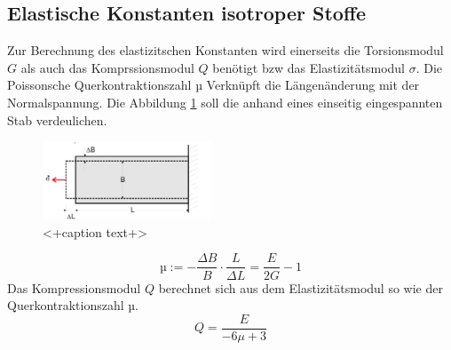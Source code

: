 \subsection{Elastische Konstanten isotroper Stoffe}
Zur Berechnung des elastizitschen Konstanten wird einerseits die Torsionsmodul $G$ als auch das Komprssionsmodul $Q$ benötigt bzw das Elastizitätsmodul $\sigma$.
Die Poissonsche Querkontraktionszahl µ Verknüpft die Längenänderung mit der Normalspannung. Die Abbildung \ref{fig:poisson} soll die anhand eines einseitig eingespannten Stab verdeulichen.
\begin{figure}
  \centering
  \includegraphics[width=5.0cm]{./picture/poisson.png}
  \caption{<+caption text+>}
  \label{fig:poisson}
\end{figure}
\begin{equation}
  \text{µ} := -\frac{\Delta B}{B} \cdot \frac{L}{\Delta L} = \frac{E}{2G} - 1
  \label{eqn:pois}
\end{equation}
Das Kompressionsmodul $Q$ berechnet sich aus dem Elastizitätsmodul so wie der Querkontraktionszahl µ.
\begin{equation}
  Q = \frac{E}{-6 \mu + 3}
  \label{eqn:komp}
\end{equation}

